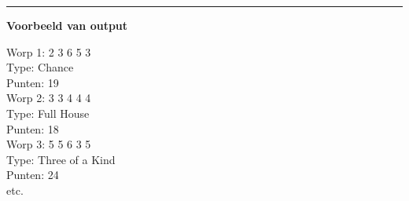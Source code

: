 \documentclass[11pt,letterpaper]{article}
\begin{document}
	\rule{\linewidth}{0.1mm}

	\bigskip
	\textbf{\large{Voorbeeld van output}} \\
	
	\smallskip
	
	Worp 1: 2 3 6 5 3 \\ 
\indent	Type: Chance  \\ 
\indent	Punten: 19 \\	
		
	Worp 2: 3 3 4 4 4  \\ 
\indent	Type: Full House  \\	
\indent	Punten: 18  \\	
	
	Worp 3: 5 5 6 3 5  \\ 
\indent	Type: Three of a Kind  \\	
\indent	Punten: 24  \\	
	
	etc. \\ 
	
\end{document}
